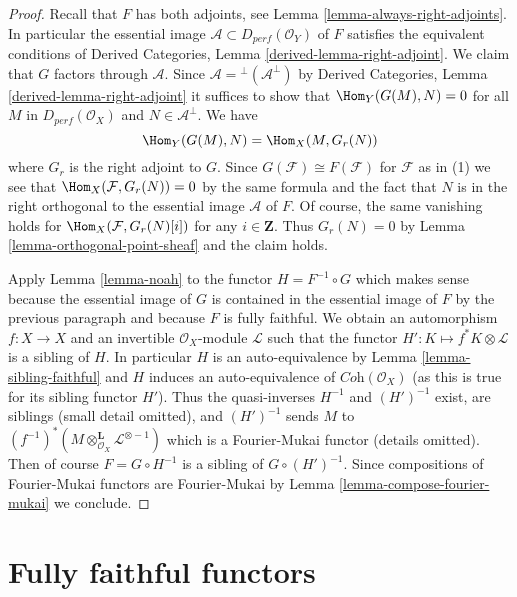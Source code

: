 \begin{proof}
Recall that $F$ has both adjoints, see
Lemma \ref{lemma-always-right-adjoints}. In particular
the essential image $\mathcal{A} \subset D_{perf}(\mathcal{O}_Y)$ of $F$
satisfies the equivalent conditions of
Derived Categories, Lemma \ref{derived-lemma-right-adjoint}.
We claim that $G$ factors through $\mathcal{A}$.
Since $\mathcal{A} = {}^\perp(\mathcal{A}^\perp)$ by
Derived Categories, Lemma \ref{derived-lemma-right-adjoint}
it suffices to show that $\Hom_Y(G(M), N) = 0$ for
all $M$ in $D_{perf}(\mathcal{O}_X)$ and $N \in \mathcal{A}^\perp$.
We have
$$
\Hom_Y(G(M), N) = \Hom_X(M, G_r(N))
$$
where $G_r$ is the right adjoint to $G$. Since
$G(\mathcal{F}) \cong F(\mathcal{F})$ for $\mathcal{F}$ as in (1)
we see that $\Hom_X(\mathcal{F}, G_r(N)) = 0$ by the same formula
and the fact that $N$ is in the right orthogonal to the essential
image $\mathcal{A}$ of $F$. Of course, the
same vanishing holds for $\Hom_X(\mathcal{F}, G_r(N)[i])$
for any $i \in \mathbf{Z}$. Thus $G_r(N) = 0$ by
Lemma \ref{lemma-orthogonal-point-sheaf}
and the claim holds.

\medskip\noindent
Apply Lemma \ref{lemma-noah} to the functor $H = F^{-1} \circ G$
which makes sense because the essential image of $G$ is contained
in the essential image of $F$ by the previous paragraph and because
$F$ is fully faithful. We obtain an automorphism $f : X \to X$
and an invertible $\mathcal{O}_X$-module $\mathcal{L}$ such that
the functor $H' : K \mapsto f^*K \otimes \mathcal{L}$
is a sibling of $H$. In particular
$H$ is an auto-equivalence by Lemma \ref{lemma-sibling-faithful}
and $H$ induces an auto-equivalence of
$\textit{Coh}(\mathcal{O}_X)$ (as this is true for its sibling functor $H'$).
Thus the quasi-inverses $H^{-1}$ and $(H')^{-1}$ exist, are siblings
(small detail omitted), and $(H')^{-1}$ sends $M$ to
$(f^{-1})^*(M \otimes_{\mathcal{O}_X}^\mathbf{L} \mathcal{L}^{\otimes -1})$
which is a Fourier-Mukai functor (details omitted).
Then of course $F = G \circ H^{-1}$ is a sibling of
$G \circ (H')^{-1}$. Since compositions of Fourier-Mukai
functors are Fourier-Mukai by
Lemma \ref{lemma-compose-fourier-mukai}
we conclude.
\end{proof}





\section{Fully faithful functors}
\label{section-fully-faithful}

